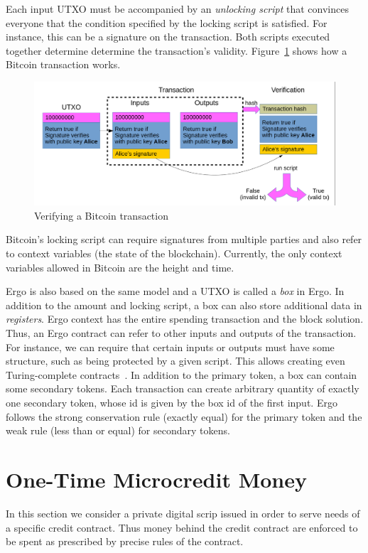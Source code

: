 \documentclass[]{llncs}   %
\begin{document}
Each input UTXO must be accompanied by an {\em unlocking script} that convinces everyone that the condition specified by the locking script is satisfied. For instance, this can be a signature on the transaction. Both scripts executed together determine determine the transaction's validity.
Figure~\ref{fig1} shows how a Bitcoin transaction works.
\begin{figure}
	\includegraphics[scale=0.24]{bitcoin}
	\caption{Verifying a Bitcoin transaction}
	\label{fig1}
\end{figure}

Bitcoin's locking script can require signatures from multiple parties and also refer to context variables (the state of the blockchain). Currently, the only context variables allowed in Bitcoin are the height and time. 

Ergo is also based on the same model and a UTXO is called a {\em box} in Ergo. In addition to the amount and locking script, a box can also store additional data in {\em registers}. Ergo context has the entire spending transaction and the block solution. Thus, an Ergo contract can refer to other inputs and outputs of the transaction. For instance, we can require that certain inputs or outputs must have some structure, such as being protected by a given script. This allows creating even Turing-complete contracts~\cite{chepurnoy2018self}. In addition to the primary token, a box can contain some secondary tokens.
Each transaction can create arbitrary quantity of exactly one secondary token, whose id is given by the box id of the first input. Ergo follows the strong conservation rule (exactly equal) for the primary token and the weak rule (less than or equal) for secondary tokens. 

\section{One-Time Microcredit Money}
\label{sec-microcredit}

 In this section we consider a private digital scrip issued in order to serve needs of a specific credit contract. Thus money behind the credit contract are enforced to be spent as prescribed by precise rules of the contract.
\end{document}
